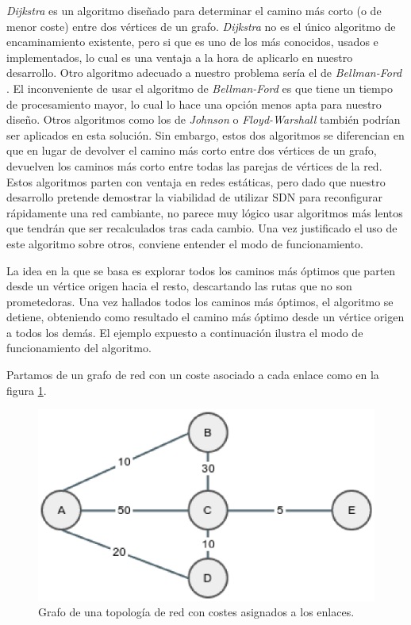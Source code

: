 \documentclass[a4paper,11pt]{book}
\begin{document}
\textit{Dijkstra} es un algoritmo diseñado para determinar el camino más corto (o de menor coste) entre dos vértices de un grafo. \textit{Dijkstra} no es el único algoritmo de encaminamiento existente, pero si que es uno de los más conocidos, usados e implementados, lo cual es una ventaja a la hora de aplicarlo en nuestro desarrollo. Otro algoritmo adecuado a nuestro problema sería el de \textit{Bellman-Ford} \cite{bellmanford}. El inconveniente de usar el algoritmo de \textit{Bellman-Ford} es que tiene un tiempo de procesamiento mayor, lo cual lo hace una opción menos apta para nuestro diseño. 
 Otros algoritmos como los de \textit{Johnson} \cite{johnson} o \textit{Floyd-Warshall} \cite{floydwarshall} también podrían ser aplicados en esta solución. Sin embargo, estos dos algoritmos se diferencian en que en lugar de devolver el camino más corto entre dos vértices de un grafo, devuelven los caminos más corto entre todas las parejas de vértices de la red. Estos algoritmos parten con ventaja en redes estáticas, pero dado que nuestro desarrollo pretende demostrar la viabilidad de utilizar \ac{SDN} para reconfigurar rápidamente una red cambiante, no parece muy lógico usar algoritmos más lentos que tendrán que ser recalculados tras cada cambio. Una vez justificado el uso de este algoritmo sobre otros, conviene entender el modo de funcionamiento.

La idea en la que se basa es explorar todos los caminos más óptimos que parten desde un vértice origen hacia el resto, descartando las rutas que no son prometedoras. Una vez hallados todos los caminos más óptimos, el algoritmo se detiene, obteniendo como resultado el camino más óptimo desde un vértice origen a todos los demás. El ejemplo expuesto a continuación ilustra el modo de funcionamiento del algoritmo.

Partamos de un grafo de red con un coste asociado a cada enlace como en la figura \ref{fig:dijkstra1}.

\begin{figure}
\centering
\includegraphics[scale=0.5]{./figuras/dijkstra1}
\caption[Grafo Inicial. \textit{Dijkstra}.]{Grafo de una topología de red con costes asignados a los enlaces.}
\label{fig:dijkstra1}
\end{figure}
\end{document}
